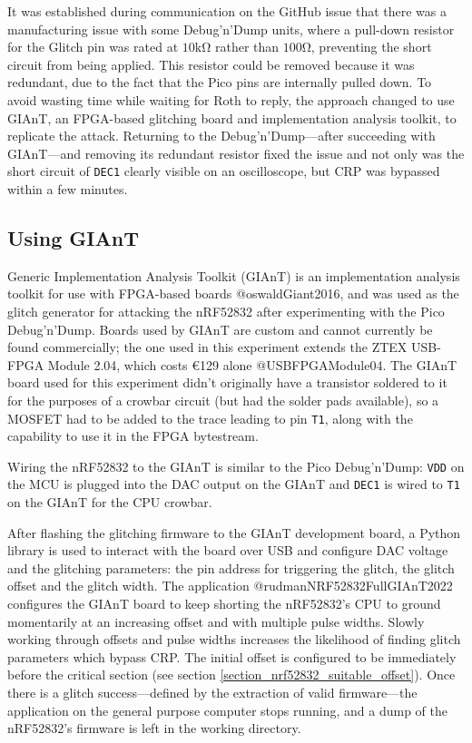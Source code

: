 It was established during communication on the GitHub issue that there
was a manufacturing issue with some Debug'n'Dump units, where a
pull-down resistor for the Glitch pin was rated at \(10\si{\kilo\ohm}\)
rather than \(100\si{\ohm}\), preventing the short circuit from being
applied. This resistor could be removed because it was redundant, due to
the fact that the Pico pins are internally pulled down. To avoid wasting
time while waiting for Roth to reply, the approach changed to use GIAnT,
an FPGA-based glitching board and implementation analysis toolkit, to
replicate the attack. Returning to the Debug'n'Dump---after succeeding
with GIAnT---and removing its redundant resistor fixed the issue and not
only was the short circuit of \texttt{DEC1} clearly visible on an
oscilloscope, but CRP was bypassed within a few minutes.

\hypertarget{using-giant}{%
\subsection{\texorpdfstring{Using
GIAnT\label{section_nrf52832_giant}}{Using GIAnT}}\label{using-giant}}

Generic Implementation Analysis Toolkit (GIAnT) is an implementation
analysis toolkit for use with FPGA-based boards @oswaldGiant2016, and
was used as the glitch generator for attacking the nRF52832 after
experimenting with the Pico Debug'n'Dump. Boards used by GIAnT are
custom and cannot currently be found commercially; the one used in this
experiment extends the ZTEX USB-FPGA Module 2.04, which costs €129 alone
@USBFPGAModule04. The GIAnT board used for this experiment didn't
originally have a transistor soldered to it for the purposes of a
crowbar circuit (but had the solder pads available), so a MOSFET had to
be added to the trace leading to pin \texttt{T1}, along with the
capability to use it in the FPGA bytestream.

Wiring the nRF52832 to the GIAnT is similar to the Pico Debug'n'Dump:
\texttt{VDD} on the MCU is plugged into the DAC output on the GIAnT and
\texttt{DEC1} is wired to \texttt{T1} on the GIAnT for the CPU crowbar.

After flashing the glitching firmware to the GIAnT development board, a
Python library is used to interact with the board over USB and configure
DAC voltage and the glitching parameters: the pin address for triggering
the glitch, the glitch offset and the glitch width. The application
@rudmanNRF52832FullGIAnT2022 configures the GIAnT board to keep shorting
the nRF52832's CPU to ground momentarily at an increasing offset and
with multiple pulse widths. Slowly working through offsets and pulse
widths increases the likelihood of finding glitch parameters which
bypass CRP. The initial offset is configured to be immediately before
the critical section (see section
\ref{section_nrf52832_suitable_offset}). Once there is a glitch
success---defined by the extraction of valid firmware---the application
on the general purpose computer stops running, and a dump of the
nRF52832's firmware is left in the working directory.

